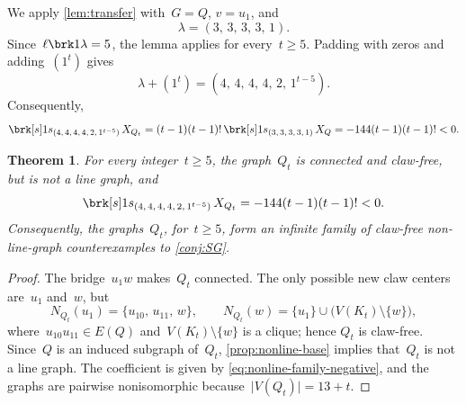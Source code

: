 \documentclass[11pt]{amsart}
\numberwithin{equation}{section}
\newtheorem{theorem}[lemma]{Theorem}
\theoremstyle{remark}
\newcommand{\CSF}{X}
\newcommand{\Qt}{Q_t}
\newcommand{\coeff}[2]{\brk[s]1{s_{#1}}\,#2}
\begin{document}
We apply \cref{lem:transfer} with~$G=Q$, $v=u_1$, and
\[
\lambda=(3,\,3,\,3,\,3,\,1).
\]
Since~$\ell\brk1{\lambda}=5$, the lemma applies for every~$t\ge5$.  Padding
with zeros and adding~$(1^t)$ gives
\[
\lambda+(1^t)=(4,\,4,\,4,\,4,\,2,\,1^{t-5}).
\]
Consequently,
\begin{equation}\label{eq:nonline-family-negative}
\coeff{(4,\,4,\,4,\,4,\,2,\,1^{t-5})}{\CSF_{\Qt}}
=(t-1)(t-1)!\,
\coeff{(3,\,3,\,3,\,3,\,1)}{\CSF_Q}
=-144(t-1)(t-1)!<0.
\end{equation}

\begin{theorem}\label{thm:nonline-family}
For every integer~$t\ge5$, the graph~$\Qt$ is connected and claw-free, but
is not a line graph, and
\[
\coeff{(4,\,4,\,4,\,4,\,2,\,1^{t-5})}{\CSF_{\Qt}}
=-144(t-1)(t-1)!<0.
\]
Consequently, the graphs~$\Qt$, for~$t\ge5$, form an infinite family of
claw-free non-line-graph counterexamples to \cref{conj:SG}.
\end{theorem}

\begin{proof}
The bridge~$u_1w$ makes~$\Qt$ connected.  The only possible new claw centers
are~$u_1$ and~$w$, but
\[
N_{\Qt}(u_1)=\{u_{10},\,u_{11},\,w\},
\qquad
N_{\Qt}(w)=\{u_1\}\cup\bigl(V(K_t)\setminus\{w\}\bigr),
\]
where~$u_{10}u_{11}\in E(Q)$ and~$V(K_t)\setminus\{w\}$ is a clique; hence
$\Qt$ is claw-free.  Since~$Q$ is an induced subgraph of~$\Qt$,
\cref{prop:nonline-base} implies that~$\Qt$ is not a line graph.  The
coefficient is given by \eqref{eq:nonline-family-negative}, and the graphs are
pairwise nonisomorphic because~$\lvert V(\Qt)\rvert=13+t$.
\end{proof}




\medskip
\end{document}
